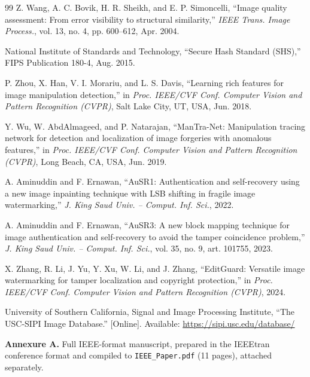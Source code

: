 \documentclass[12pt,a4paper]{article}
\begin{document}
\begin{thebibliography}{99}
 Z. Wang, A. C. Bovik, H. R. Sheikh, and E. P. Simoncelli, ``Image quality assessment: From error visibility to structural similarity,'' \emph{IEEE Trans. Image Process.}, vol. 13, no. 4, pp. 600--612, Apr. 2004.

 National Institute of Standards and Technology, ``Secure Hash Standard (SHS),'' FIPS Publication 180-4, Aug. 2015.

 P. Zhou, X. Han, V. I. Morariu, and L. S. Davis, ``Learning rich features for image manipulation detection,'' in \emph{Proc. IEEE/CVF Conf. Computer Vision and Pattern Recognition (CVPR)}, Salt Lake City, UT, USA, Jun. 2018.

 Y. Wu, W. AbdAlmageed, and P. Natarajan, ``ManTra-Net: Manipulation tracing network for detection and localization of image forgeries with anomalous features,'' in \emph{Proc. IEEE/CVF Conf. Computer Vision and Pattern Recognition (CVPR)}, Long Beach, CA, USA, Jun. 2019.

 A. Aminuddin and F. Ernawan, ``AuSR1: Authentication and self-recovery using a new image inpainting technique with LSB shifting in fragile image watermarking,'' \emph{J. King Saud Univ. -- Comput. Inf. Sci.}, 2022.

 A. Aminuddin and F. Ernawan, ``AuSR3: A new block mapping technique for image authentication and self-recovery to avoid the tamper coincidence problem,'' \emph{J. King Saud Univ. -- Comput. Inf. Sci.}, vol. 35, no. 9, art. 101755, 2023.

 X. Zhang, R. Li, J. Yu, Y. Xu, W. Li, and J. Zhang, ``EditGuard: Versatile image watermarking for tamper localization and copyright protection,'' in \emph{Proc. IEEE/CVF Conf. Computer Vision and Pattern Recognition (CVPR)}, 2024.

 University of Southern California, Signal and Image Processing Institute, ``The USC-SIPI Image Database.'' [Online]. Available: \url{https://sipi.usc.edu/database/}

\end{thebibliography}

\vspace{0.3in}
\noindent\textbf{Annexure A.} Full IEEE-format manuscript, prepared in the
IEEEtran conference format and compiled to
\mbox{\texttt{IEEE\_Paper.pdf}} (11 pages), attached separately.
\end{document}
